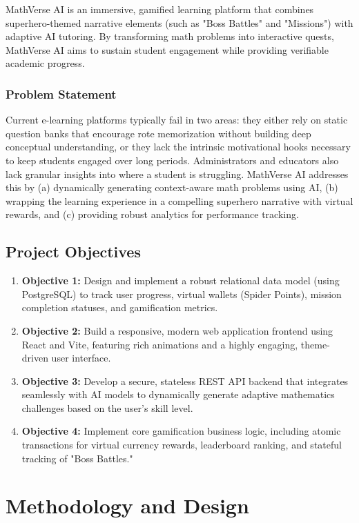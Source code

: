 \documentclass[12pt,a4paper]{report}
\begin{document}
MathVerse AI is an immersive, gamified learning platform that combines superhero-themed narrative elements (such as "Boss Battles" and "Missions") with adaptive AI tutoring. By transforming math problems into interactive quests, MathVerse AI aims to sustain student engagement while providing verifiable academic progress.

\subsection{Problem Statement}
Current e-learning platforms typically fail in two areas: they either rely on static question banks that encourage rote memorization without building deep conceptual understanding, or they lack the intrinsic motivational hooks necessary to keep students engaged over long periods. Administrators and educators also lack granular insights into where a student is struggling. MathVerse AI addresses this by (a) dynamically generating context-aware math problems using AI, (b) wrapping the learning experience in a compelling superhero narrative with virtual rewards, and (c) providing robust analytics for performance tracking.

\section{Project Objectives}
\begin{enumerate}
    \item \textbf{Objective 1:} Design and implement a robust relational data model (using PostgreSQL) to track user progress, virtual wallets (Spider Points), mission completion statuses, and gamification metrics.
    \item \textbf{Objective 2:} Build a responsive, modern web application frontend using React and Vite, featuring rich animations and a highly engaging, theme-driven user interface.
    \item \textbf{Objective 3:} Develop a secure, stateless REST API backend that integrates seamlessly with AI models to dynamically generate adaptive mathematics challenges based on the user's skill level.
    \item \textbf{Objective 4:} Implement core gamification business logic, including atomic transactions for virtual currency rewards, leaderboard ranking, and stateful tracking of "Boss Battles."
\end{enumerate}

\chapter{Methodology and Design}
\end{document}
